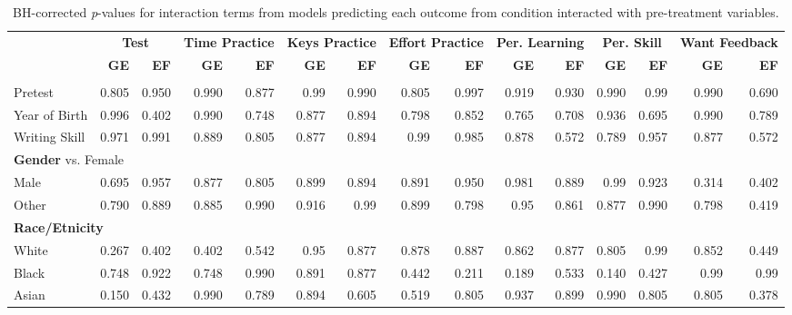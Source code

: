 \documentclass[11pt]{report}
\begin{document}
\begin{append}
\begin{landscape}
\begin{table}[]
    \centering
        \caption{BH-corrected \textit{p}-values for interaction terms from models predicting each outcome from condition interacted with pre-treatment variables.}
\footnotesize
    \begin{tabular}{lrrrrrrrrrrrrrr}
\toprule
 & \multicolumn{2}{c}{\textbf{Test}} & \multicolumn{2}{c}{\textbf{Time Practice}} & \multicolumn{2}{c}{\textbf{Keys Practice}} & \multicolumn{2}{c}{\textbf{Effort Practice}} & \multicolumn{2}{c}{\textbf{Per. Learning}} & \multicolumn{2}{c}{\textbf{Per. Skill}} & \multicolumn{2}{c}{\textbf{Want Feedback}} \\ 
\cmidrule(lr){2-3} \cmidrule(lr){4-5} \cmidrule(lr){6-7} \cmidrule(lr){8-9} \cmidrule(lr){10-11} \cmidrule(lr){12-13} \cmidrule(lr){14-15}
 & \textbf{GE} & \textbf{EF} & \textbf{GE} & \textbf{EF}  & \textbf{GE} & \textbf{EF}  & \textbf{GE} & \textbf{EF}  & \textbf{GE} & \textbf{EF} &\textbf{GE} & \textbf{EF}& \textbf{GE} & \textbf{EF}  \\ 
\midrule
\multicolumn{15}{l}{} \\[2.5pt] 
\midrule
Pretest & 0.805 & 0.950 & 0.990 & 0.877 & 0.99 & 0.990 & 0.805 & 0.997 & 0.919 & 0.930 & 0.990 & 0.99 & 0.990 & 0.690 \\ 
Year of Birth & 0.996 & 0.402 & 0.990 & 0.748 & 0.877 & 0.894 & 0.798 & 0.852 & 0.765 & 0.708 & 0.936 & 0.695 & 0.990 & 0.789 \\ 
Writing Skill & 0.971 & 0.991 & 0.889 & 0.805 & 0.877 & 0.894 & 0.99 & 0.985 & 0.878 & 0.572 & 0.789 & 0.957 & 0.877 & 0.572 \\ 
\midrule
\multicolumn{15}{l}{\textbf{Gender} vs. Female} \\[2.5pt] 
\midrule
Male & 0.695 & 0.957 & 0.877 & 0.805 & 0.899 & 0.894 & 0.891 & 0.950 & 0.981 & 0.889 & 0.99 & 0.923 & 0.314 & 0.402 \\ 
Other & 0.790 & 0.889 & 0.885 & 0.990 & 0.916 & 0.99 & 0.899 & 0.798 & 0.95 & 0.861 & 0.877 & 0.990 & 0.798 & 0.419 \\ 
\midrule
\multicolumn{15}{l}{\textbf{Race/Etnicity}} \\[2.5pt] 
\midrule
White & 0.267 & 0.402 & 0.402 & 0.542 & 0.95 & 0.877 & 0.878 & 0.887 & 0.862 & 0.877 & 0.805 & 0.99 & 0.852 & 0.449 \\ 
Black & 0.748 & 0.922 & 0.748 & 0.990 & 0.891 & 0.877 & 0.442 & 0.211 & 0.189 & 0.533 & 0.140 & 0.427 & 0.99 & 0.99 \\ 
Asian & 0.150 & 0.432 & 0.990 & 0.789 & 0.894 & 0.605 & 0.519 & 0.805 & 0.937 & 0.899 & 0.990 & 0.805 & 0.805 & 0.378 \\ 

\end{tabular}
\end{table}
\end{landscape}
\end{append}
\end{document}
